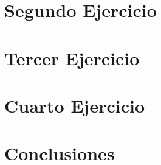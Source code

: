 \documentclass{article}
\begin{document}
	\section{Segundo Ejercicio}
	
	\newpage
	
	\section{Tercer Ejercicio}
	
	\newpage
	
	\section{Cuarto Ejercicio}
	
	\newpage
	
	\section{Conclusiones}
	
	\newpage
	
\end{document}
